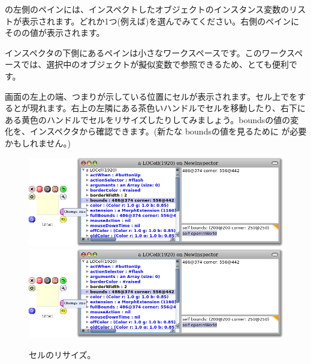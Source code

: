 \documentclass[a4paper,10pt,twoside]{book}
\begin{document}
の左側のペインには、インスペクトしたオブジェクトのインスタンス変数のリストが表示されます。どれか1つ(例えば\mbox{})を選んでみてください。右側のペインにそのの値が表示されます。


インスペクタの下側にあるペインは小さなワークスペースです。このワークスペースでは、選択中のオブジェクトが擬似変数\self で参照できるため、とても便利です。


画面の左上の端、つまりが示している位置にセルが表示されます。セル上で\metaclick をするとが現れます。右上の左隣にある茶色いハンドルでセルを移動したり、右下にある黄色のハンドルでセルをリサイズしたりしてみましょう。boundsの値の変化を、インスペクタから確認できます。(新たな boundsの値を見るために  \actclick が必要かもしれません。)

\begin{figure}[htbp]
\centering
\ifluluelse
	{\includegraphics[width=\textwidth]{LOCellResize} }
	{\includegraphics[scale=0.7]{LOCellResize} }
\caption{セルのリサイズ。}
\end{figure}
\end{document}
